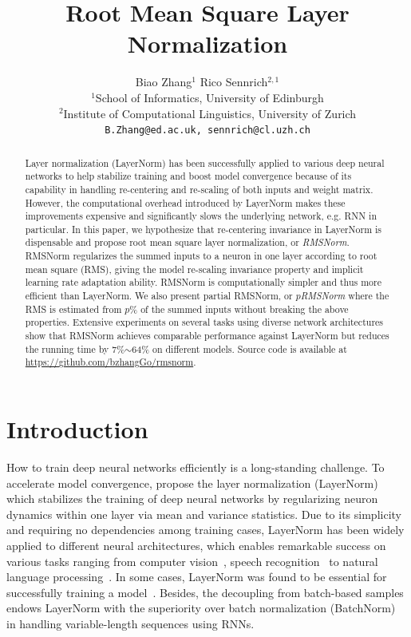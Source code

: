 \documentclass{article}
\title{Root Mean Square Layer Normalization}
\author{
  }
\author{%
  Biao Zhang$^1$ \quad Rico Sennrich$^{2,1}$ \\
  $^1$School of Informatics, University of Edinburgh \\
  $^2$Institute of Computational Linguistics, University of Zurich \\
  \texttt{B.Zhang@ed.ac.uk, sennrich@cl.uzh.ch}
}
\begin{document}
\maketitle

\begin{abstract}

Layer normalization (LayerNorm) has been successfully applied to various deep neural networks to help stabilize training and boost model convergence because of its capability in handling re-centering and re-scaling of both inputs and weight matrix. 
However, the computational overhead introduced by LayerNorm makes these improvements expensive and significantly slows the underlying network, e.g. RNN in particular.  
In this paper, we hypothesize that re-centering invariance in LayerNorm is dispensable and propose root mean square layer normalization, or \textit{RMSNorm}. RMSNorm regularizes the summed inputs to a neuron in one layer according to root mean square (RMS), giving the model re-scaling invariance property and implicit learning rate adaptation ability.
RMSNorm is computationally simpler and thus more efficient than LayerNorm.
We also present partial RMSNorm, or \textit{$p$RMSNorm} where the RMS is estimated from $p$\% of the summed inputs without breaking the above properties.
Extensive experiments on several tasks using diverse network architectures show that RMSNorm achieves comparable performance against LayerNorm but reduces the running time by 7\%$\sim$64\% on different models. Source code is available at \url{https://github.com/bzhangGo/rmsnorm}.
\end{abstract}

\section{Introduction}

How to train deep neural networks efficiently is a long-standing challenge. To accelerate model convergence, \citet{ba2016layer} propose the layer normalization (LayerNorm) which stabilizes the training of deep neural networks by regularizing neuron dynamics within one layer via mean and variance statistics. Due to its simplicity and requiring no dependencies among training cases, LayerNorm has been widely applied to different neural architectures, which enables remarkable success on various tasks ranging from computer vision~\cite{parmar2018image,sharma2018conceptual}, speech recognition~\cite{zhou2018syllable} to natural language processing~\cite{NIPS2017_7181,zhang2019lightweight}. In some cases, LayerNorm was found to be essential for successfully training a model~\cite{P18-1008}. Besides, the decoupling from batch-based samples endows LayerNorm with the superiority over batch normalization (BatchNorm)~\cite{Ioffe:2015:BNA:3045118.3045167} in handling variable-length sequences using RNNs.
\end{document}
